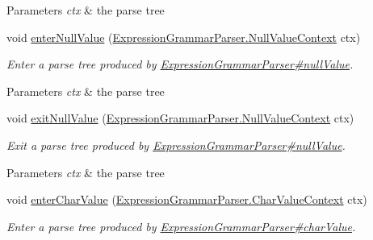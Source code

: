 \begin{DoxyCompactItemize}
\begin{DoxyCompactList}
\begin{DoxyParams}{Parameters}
{\em ctx} & the parse tree\\
\hline
\end{DoxyParams}
 \end{DoxyCompactList}\item 
void \hyperlink{classgov_1_1nasa_1_1jpf_1_1inspector_1_1server_1_1expression_1_1parser_1_1_expression_grammar_base_listener_a4a2591cb8d022c3a5f688cd2b4707137}{enter\+Null\+Value} (\hyperlink{classgov_1_1nasa_1_1jpf_1_1inspector_1_1server_1_1expression_1_1parser_1_1_expression_grammar_parser_1_1_null_value_context}{Expression\+Grammar\+Parser.\+Null\+Value\+Context} ctx)
\begin{DoxyCompactList}\small\item\em Enter a parse tree produced by \hyperlink{classgov_1_1nasa_1_1jpf_1_1inspector_1_1server_1_1expression_1_1parser_1_1_expression_grammar_parser_add50e568210a7d65dec28cfe9e9d0ce8}{Expression\+Grammar\+Parser\#null\+Value}.


\begin{DoxyParams}{Parameters}
{\em ctx} & the parse tree\\
\hline
\end{DoxyParams}
 \end{DoxyCompactList}\item 
void \hyperlink{classgov_1_1nasa_1_1jpf_1_1inspector_1_1server_1_1expression_1_1parser_1_1_expression_grammar_base_listener_aa486ea7121a9db95473dcb6d2e17af3d}{exit\+Null\+Value} (\hyperlink{classgov_1_1nasa_1_1jpf_1_1inspector_1_1server_1_1expression_1_1parser_1_1_expression_grammar_parser_1_1_null_value_context}{Expression\+Grammar\+Parser.\+Null\+Value\+Context} ctx)
\begin{DoxyCompactList}\small\item\em Exit a parse tree produced by \hyperlink{classgov_1_1nasa_1_1jpf_1_1inspector_1_1server_1_1expression_1_1parser_1_1_expression_grammar_parser_add50e568210a7d65dec28cfe9e9d0ce8}{Expression\+Grammar\+Parser\#null\+Value}.


\begin{DoxyParams}{Parameters}
{\em ctx} & the parse tree\\
\hline
\end{DoxyParams}
 \end{DoxyCompactList}\item 
void \hyperlink{classgov_1_1nasa_1_1jpf_1_1inspector_1_1server_1_1expression_1_1parser_1_1_expression_grammar_base_listener_a5c53de8efa88bd839d94969cbfba17a4}{enter\+Char\+Value} (\hyperlink{classgov_1_1nasa_1_1jpf_1_1inspector_1_1server_1_1expression_1_1parser_1_1_expression_grammar_parser_1_1_char_value_context}{Expression\+Grammar\+Parser.\+Char\+Value\+Context} ctx)
\begin{DoxyCompactList}\small\item\em Enter a parse tree produced by \hyperlink{classgov_1_1nasa_1_1jpf_1_1inspector_1_1server_1_1expression_1_1parser_1_1_expression_grammar_parser_ac136542b03653c7a98f0dbbea5b454e5}{Expression\+Grammar\+Parser\#char\+Value}.



\end{DoxyCompactList}
\end{DoxyCompactItemize}
